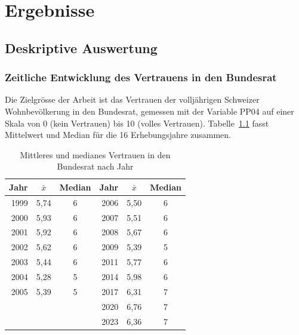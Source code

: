 

\chapter{Ergebnisse}
\label{Chapter3}


\section{Deskriptive Auswertung}
\label{sec:deskriptiv}

\subsection{Zeitliche Entwicklung des Vertrauens in den Bundesrat}
\label{subsec:zeitlich}

Die Zielgrösse der Arbeit ist das Vertrauen der volljährigen Schweizer
Wohnbevölkerung in den Bundesrat, gemessen mit der Variable PP04 auf einer
Skala von 0 (kein Vertrauen) bis 10 (volles Vertrauen). Tabelle~\ref{tab:vertrauen_jahr}
fasst Mittelwert und Median für die 16 Erhebungsjahre zusammen.

\begin{table}[h]
\centering
\caption{Mittleres und medianes Vertrauen in den Bundesrat nach Jahr}
\label{tab:vertrauen_jahr}
\begin{tabular}{rcc@{\hspace{2em}}rcc}
\toprule
Jahr & $\bar{x}$ & Median & Jahr & $\bar{x}$ & Median \\
\midrule
1999 & 5{,}74 & 6 & 2006 & 5{,}50 & 6 \\
2000 & 5{,}93 & 6 & 2007 & 5{,}51 & 6 \\
2001 & 5{,}92 & 6 & 2008 & 5{,}67 & 6 \\
2002 & 5{,}62 & 6 & 2009 & 5{,}39 & 5 \\
2003 & 5{,}44 & 6 & 2011 & 5{,}77 & 6 \\
2004 & 5{,}28 & 5 & 2014 & 5{,}98 & 6 \\
2005 & 5{,}39 & 5 & 2017 & 6{,}31 & 7 \\
     &        &   & 2020 & 6{,}76 & 7 \\
     &        &   & 2023 & 6{,}36 & 7 \\
\bottomrule
\end{tabular}
\end{table}

